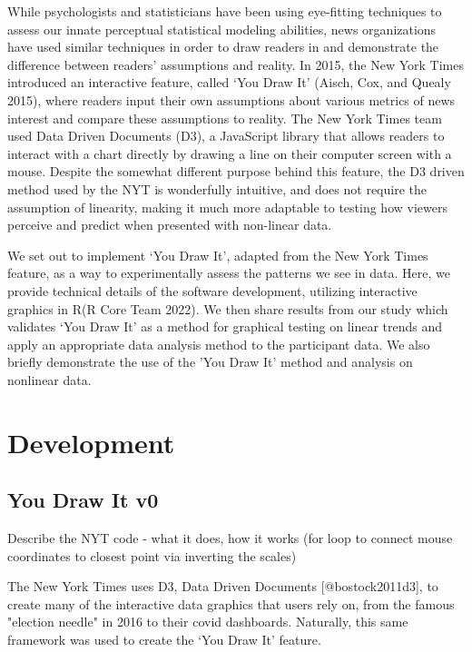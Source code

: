 \documentclass[
  letterpaper,
  DIV=11,
  numbers=noendperiod]{scrartcl}
\newcommand{\svp}[1]{{\textcolor{RedOrange}{#1}}}
\begin{document}
\svp{While psychologists and statisticians have been using eye-fitting techniques to assess our innate perceptual statistical modeling abilities, news organizations have used similar techniques in order to draw readers in and demonstrate the difference between readers' assumptions and reality.}
In 2015, the New York Times introduced an interactive feature, called
`You Draw It' (Aisch, Cox, and Quealy 2015), where readers input their
own assumptions about various \svp{metrics of news interest} and compare
these assumptions to reality. The New York Times team used Data Driven
Documents (D3), \svp{a JavaScript library} that allows readers to
\svp{interact with a chart directly by} drawing a line on their computer
screen with a mouse.
\svp{Despite the somewhat different purpose behind this feature, the D3 driven method used by the NYT is wonderfully intuitive, and does not require the assumption of linearity, making it much more adaptable to testing how viewers perceive and predict when presented with non-linear data.}

\svp{We set out to implement} `You Draw It', adapted from the New York
Times feature, as a way to experimentally assess the patterns we see in
data. Here, we provide technical details of the software development,
utilizing interactive graphics in R(R Core Team 2022). We then share
results from our study which validates `You Draw It' as a method for
graphical testing \svp{on linear trends} and apply an appropriate data
analysis method to the participant data.
\svp{We also briefly demonstrate the use of the 'You Draw It' method and analysis on nonlinear data.}

\hypertarget{development}{%
\section{Development}\label{development}}

\hypertarget{you-draw-it-v0}{%
\subsection{You Draw It v0}\label{you-draw-it-v0}}

\svp{Describe the NYT code - what it does, how it works (for loop to connect mouse coordinates to closest point via inverting the scales)}

\svp{The New York Times uses D3, Data Driven Documents [@bostock2011d3], to create many of the interactive data graphics that users rely on, from the famous "election needle" in 2016 to their covid dashboards. Naturally, this same framework was used}
to create the `You Draw It' \svp{feature}.
\end{document}
